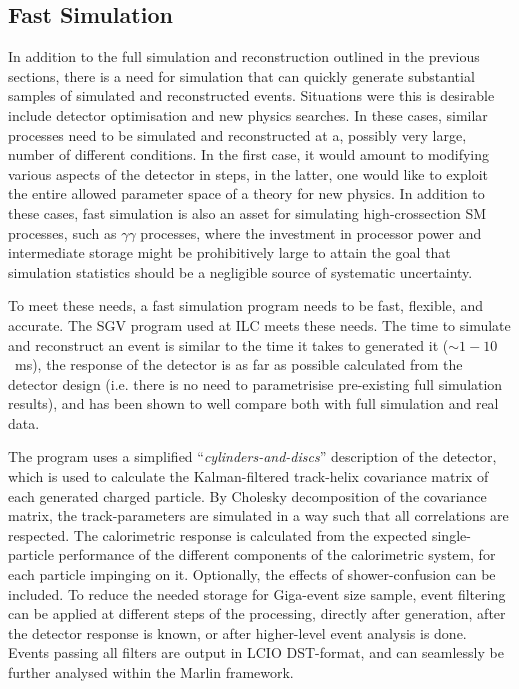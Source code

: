 \subsection{\label{sub:sw-fastsim}Fast Simulation}

In addition to the full simulation and reconstruction 
outlined in the previous sections,
there is a need for simulation that can quickly generate
substantial samples of simulated and reconstructed events.
Situations were this is desirable include detector optimisation
and new physics searches. In these cases,
similar processes need to be simulated and reconstructed at
a, possibly very large, number of different conditions.
In the first case, it would amount to modifying various aspects
of the detector in steps, in the latter,
one would like to exploit the entire allowed parameter space
of a theory for new physics.
In addition to these cases,
fast simulation is also an asset for simulating high-crossection
SM processes, such as $\gamma\gamma$ processes, where the investment 
in processor power and intermediate storage might be
prohibitively large to attain the goal that simulation statistics
should be a negligible source of systematic uncertainty.

To meet these needs,
a fast simulation program needs to be fast, flexible, and
accurate. 
The SGV program\cite{Berggren:2012ar} used at ILC meets these needs.
The time to simulate and reconstruct an event is similar to
the time it takes to generated it ($\sim 1-10$~ms),
the response of the detector is as far as possible calculated
from the detector design (i.e. there is no need to parametrisise
pre-existing full simulation results),
and has been shown to well compare both with full simulation
and real data\cite{Abdallah:2003xe}.

The program uses a simplified ``{\it cylinders-and-discs}'' description
of the detector,
which is used to calculate the Kalman-filtered track-helix covariance matrix
of each generated charged particle.
By Cholesky decomposition of the covariance matrix,
the track-parameters are simulated in a way such that all correlations
are respected.
The calorimetric response is calculated from the expected single-particle
performance of the different components of the calorimetric system,
for each particle impinging on it. Optionally,
the effects of shower-confusion can be included.
To reduce the needed storage for Giga-event size sample,
event filtering can be applied at different steps of the processing,
directly after generation, after the detector response is known,
or after higher-level event analysis is done.
Events passing all filters are output in LCIO DST-format,
and can seamlessly be further analysed within the Marlin framework.


